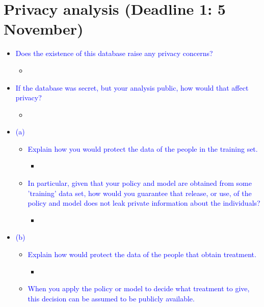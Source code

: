 \documentclass[a4paper, 12pt]{extarticle}
\begin{document}
\section*{Privacy analysis (Deadline 1: 5 November)}
\begin{itemize}
    \item \textcolor{blue}{Does the existence of this database raise any privacy concerns?}
        \begin{itemize}
            \item 
        \end{itemize}
    \item \textcolor{blue}{If the database was secret, but your analysis public, how would that affect privacy?}
        \begin{itemize}
            \item 
        \end{itemize}
    \item \textcolor{blue}{(a)}
        \begin{itemize}
            \item \textcolor{blue}{Explain how you would protect the data of the people in the training set.}
                \begin{itemize}
                    \item 
                \end{itemize}
            \item \textcolor{blue}{In particular, given that your policy and model are obtained from some 'training' data set, how would you guarantee that release, or use, of the policy and model does not leak private information about the individuals?}
                \begin{itemize}
                    \item 
                \end{itemize}
        \end{itemize}
    \item \textcolor{blue}{(b)}
        \begin{itemize}
            \item \textcolor{blue}{Explain how would protect the data of the people that obtain treatment.}
                \begin{itemize}
                    \item 
                \end{itemize}
            \item \textcolor{blue}{When you apply the policy or model to decide what treatment to give, this decision can be assumed to be publicly available.}

\end{itemize}
\end{itemize}
\end{document}
